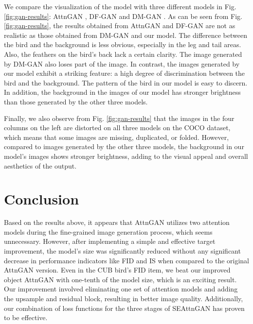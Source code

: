 \documentclass[runningheads, orivec]{llncs}
\begin{document}
We compare the visualization of the model with three different models in Fig. \ref{fig:gan-results}: AttnGAN \cite{xu2018attngan}, DF-GAN and DM-GAN \cite{zhu2019dm}. As can be seen from Fig. \ref{fig:gan-results}, the results obtained from AttnGAN and DF-GAN are not as realistic as those obtained from DM-GAN and our model. The difference between the bird and the background is less obvious, especially in the leg and tail areas. Also, the feathers on the bird's back lack a certain clarity. The image generated by DM-GAN also loses part of the image. In contrast, the images generated by our model exhibit a striking feature: a high degree of discrimination between the bird and the background. The pattern of the bird in our model is easy to discern. In addition, the background in the images of our model has stronger brightness than those generated by the other three models.

Finally, we also observe from Fig. \ref{fig:gan-results} that the images in the four columns on the left are distorted on all three models on the COCO dataset, which means that some images are missing, duplicated, or folded. However, compared to images generated by the other three models, the background in our model's images shows stronger brightness, adding to the visual appeal and overall aesthetics of the output.

\vspace{-10pt}
\section{Conclusion}
\vspace{-10pt}
Based on the results above, it appears that AttnGAN utilizes two attention models during the fine-grained image generation process, which seems unnecessary. However, after implementing a simple and effective target improvement, the model's size was significantly reduced without any significant decrease in performance indicators like FID and IS when compared to the original AttnGAN version. Even in the CUB bird's FID item, we beat our improved object AttnGAN with one-tenth of the model size, which is an exciting result. Our improvement involved eliminating one set of attention models and adding the upsample and residual block, resulting in better image quality. Additionally, our combination of loss functions for the three stages of SEAttnGAN has proven to be effective.
\vspace{-10pt}
\end{document}

